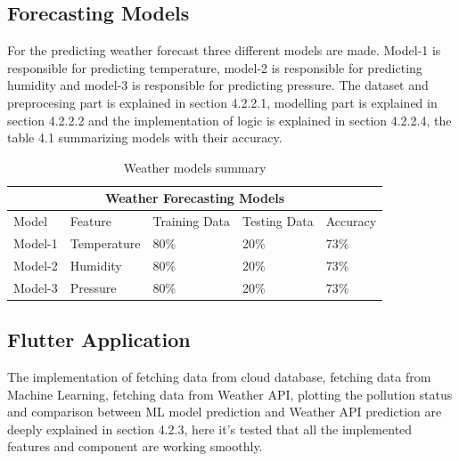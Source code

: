 \subsection{Forecasting Models}
For the predicting weather forecast three different models are made. Model-1 is responsible for predicting temperature, model-2 is responsible for predicting humidity and model-3 is responsible for predicting pressure. The dataset and preprocesing part is explained in section 4.2.2.1, modelling part is explained in section 4.2.2.2 and the implementation of logic is explained in section 4.2.2.4, the table 4.1 summarizing models with their accuracy.

\begin{table}[!ht]
\centering
\begin{tabular}{ |p{2cm}|p{2cm}|p{2cm}|p{2cm}|p{2cm}| }
\hline
\multicolumn{5}{|c|}{Weather Forecasting Models} \\
\hline
Model&Feature&Training Data&Testing Data&Accuracy \\
\hline
Model-1&Temperature&80\%&20\%&73\%\\
Model-2 &Humidity&80\%&20\%&73\%\\
Model-3 &Pressure&80\%&20\%&73\%\\
\hline
\end{tabular}
\caption{\label{data}Weather models summary}
\end{table}

\subsection{Flutter Application}

The implementation of fetching data from cloud database, fetching data from Machine Learning, fetching data from Weather API, plotting the pollution status and comparison between ML model prediction and Weather API prediction are deeply explained in section 4.2.3, here it's tested that all the implemented features and component are working smoothly.

